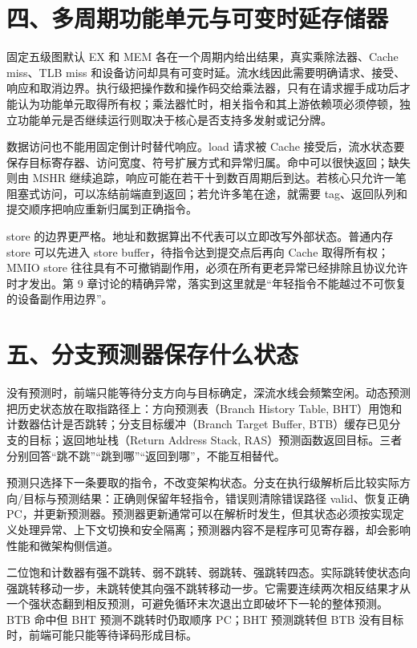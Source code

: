 \section{四、多周期功能单元与可变时延存储器}

固定五级图默认 EX 和 MEM 各在一个周期内给出结果，真实乘除法器、Cache miss、TLB miss 和设备访问却具有可变时延。流水线因此需要明确请求、接受、响应和取消边界。执行级把操作数和操作码交给乘法器，只有在请求握手成功后才能认为功能单元取得所有权；乘法器忙时，相关指令和其上游依赖项必须停顿，独立功能单元是否继续运行则取决于核心是否支持多发射或记分牌。

数据访问也不能用固定倒计时替代响应。load 请求被 Cache 接受后，流水状态要保存目标寄存器、访问宽度、符号扩展方式和异常归属。命中可以很快返回；缺失则由 MSHR 继续追踪，响应可能在若干十到数百周期后到达。若核心只允许一笔阻塞式访问，可以冻结前端直到返回；若允许多笔在途，就需要 tag、返回队列和提交顺序把响应重新归属到正确指令。

store 的边界更严格。地址和数据算出不代表可以立即改写外部状态。普通内存 store 可以先进入 store buffer，待指令达到提交点后再向 Cache 取得所有权；MMIO store 往往具有不可撤销副作用，必须在所有更老异常已经排除且协议允许时才发出。第 9 章讨论的精确异常，落实到这里就是“年轻指令不能越过不可恢复的设备副作用边界”。

\section{五、分支预测器保存什么状态}

没有预测时，前端只能等待分支方向与目标确定，深流水线会频繁空闲。动态预测把历史状态放在取指路径上：方向预测表（Branch History Table, BHT）用饱和计数器估计是否跳转；分支目标缓冲（Branch Target Buffer, BTB）缓存已见分支的目标；返回地址栈（Return Address Stack, RAS）预测函数返回目标。三者分别回答“跳不跳”“跳到哪”“返回到哪”，不能互相替代。

预测只选择下一条要取的指令，不改变架构状态。分支在执行级解析后比较实际方向/目标与预测结果：正确则保留年轻指令，错误则清除错误路径 valid、恢复正确 PC，并更新预测器。预测器更新通常可以在解析时发生，但其状态必须按实现定义处理异常、上下文切换和安全隔离；预测器内容不是程序可见寄存器，却会影响性能和微架构侧信道。

二位饱和计数器有强不跳转、弱不跳转、弱跳转、强跳转四态。实际跳转使状态向强跳转移动一步，未跳转使其向强不跳转移动一步。它需要连续两次相反结果才从一个强状态翻到相反预测，可避免循环末次退出立即破坏下一轮的整体预测。BTB 命中但 BHT 预测不跳转时仍取顺序 PC；BHT 预测跳转但 BTB 没有目标时，前端可能只能等待译码形成目标。

